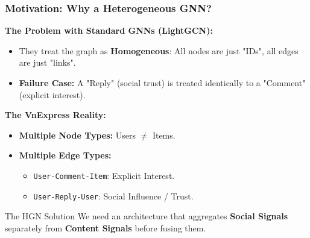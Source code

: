\documentclass{beamer}
\begin{document}
\begin{frame}
    \frametitle{Motivation: Why a Heterogeneous GNN?}
    \textbf{The Problem with Standard GNNs (LightGCN):}
    \begin{itemize}
        \item They treat the graph as \textbf{Homogeneous}: All nodes are just "IDs", all edges are just "links".
        \item \color{red} \textbf{Failure Case:} \color{black} A "Reply" (social trust) is treated identically to a "Comment" (explicit interest).
    \end{itemize}

    \vspace{0.3cm}
    \textbf{The VnExpress Reality:}
    \begin{itemize}
        \item \textbf{Multiple Node Types:} Users $\ne$ Items.
        \item \textbf{Multiple Edge Types:}
              \begin{itemize}
                  \item \texttt{User-Comment-Item}: Explicit Interest.
                  \item \texttt{User-Reply-User}: Social Influence / Trust.
              \end{itemize}
    \end{itemize}

    \vspace{0.2cm}
    \begin{block}{The HGN Solution}
        We need an architecture that aggregates \textbf{Social Signals} separately from \textbf{Content Signals} before fusing them.
    \end{block}
\end{frame}
\end{document}
